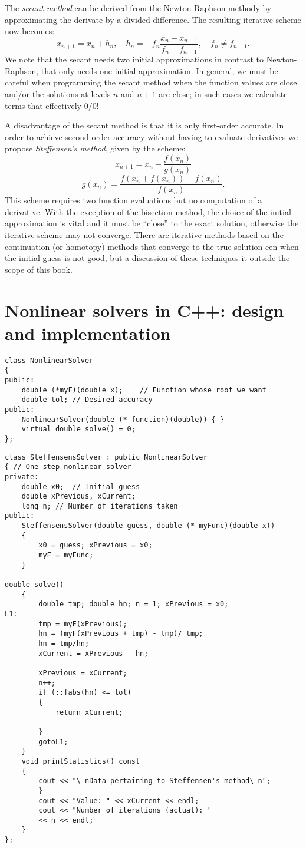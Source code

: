The \emph{secant method} can be derived from the Newton-Raphson methody by approximating the derivate by a divided difference. The resulting iterative scheme now becomes: \[ x_{n+1}=x_{n}+h_{n},\quad h_{n}=-f_{n}\frac{x_{n}-x_{n-1}}{f_{n}-f_{n-1}},\quad f_{n}\neq f_{n-1}. \] We note that the secant needs two initial approximations in contrast to Newton-Raphson, that only needs one initial approximation. In general, we must be careful when programming the secant method when the function values are close and/or the solutions at levels $n$ and $n+1$ are close; in such cases we calculate terms that effectively $0/0!$

A disadvantage of the secant method is that it is only first-order accurate. In order to achieve second-order accuracy without having to evaluate derivatives we propose \emph{Steffensen's method}, given by the scheme: \[ x_{n+1}=x_{n}-\frac{f\left(x_{n}\right)}{g\left(x_{n}\right)} \] \[ g\left(x_{n}\right)=\frac{f\left(x_{n}+f\left(x_{n}\right)\right)-f\left(x_{n}\right)}{f\left(x_{n}\right)}. \] This scheme requires two function evaluations but no computation of a derivative. With the exception of the bisection method, the choice of the initial approximation is vital and it must be ``close'' to the exact solution, otherwise the iterative scheme may not converge. There are iterative methods based on the continuation (or homotopy) methods that converge to the true solution een when the initial guess is not good, but a discussion of these techniques it outside the scope of this book.

\section{Nonlinear solvers in C++: design and implementation}

\begin{lstlisting}
class NonlinearSolver
{
public:
	double (*myF)(double x);	// Function whose root we want
	double tol;	// Desired accuracy
public:
	NonlinearSolver(double (* function)(double)) { }
	virtual double solve() = 0;
};
\end{lstlisting}

\begin{lstlisting}
class SteffensensSolver : public NonlinearSolver
{ // One-step nonlinear solver
private:
	double x0;	// Initial guess
	double xPrevious, xCurrent;
	long n;	// Number of iterations taken
public:
	SteffensensSolver(double guess, double (* myFunc)(double x))
	{
		x0 = guess; xPrevious = x0;
		myF = myFunc;
	}

double solve()
	{
		double tmp; double hn; n = 1; xPrevious = x0;
L1:
		tmp = myF(xPrevious);
		hn = (myF(xPrevious + tmp) - tmp)/ tmp;
		hn = tmp/hn;
		xCurrent = xPrevious - hn;

		xPrevious = xCurrent;
		n++;
		if (::fabs(hn) <= tol)
		{
			return xCurrent;

		}
		gotoL1;
	}
	void printStatistics() const
	{
		cout << "\ nData pertaining to Steffensen's method\ n";
		}
		cout << "Value: " << xCurrent << endl;
		cout << "Number of iterations (actual): "
		<< n << endl;
	}
};
\end{lstlisting}

